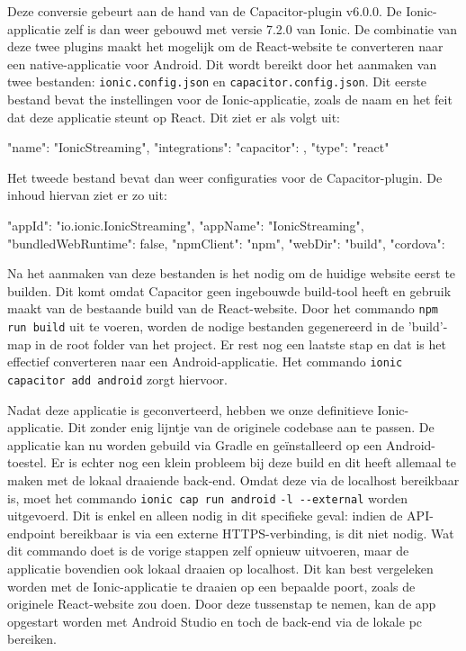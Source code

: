 Deze conversie gebeurt aan de hand van de Capacitor-plugin v6.0.0. De Ionic-applicatie zelf is dan weer gebouwd met versie 7.2.0 van Ionic. De combinatie van deze twee plugins maakt het mogelijk om de React-website te converteren naar een native-applicatie voor Android. Dit wordt bereikt door het aanmaken van twee bestanden: \verb|ionic.config.json| en \verb|capacitor.config.json|. Dit eerste bestand bevat the instellingen voor de Ionic-applicatie, zoals de naam en het feit dat deze applicatie steunt op React. Dit ziet er als volgt uit:

\begin{LVerbatim}[language=JavaScript]
{
  "name": "IonicStreaming",
  "integrations": {
    "capacitor": {}
  },
  "type": "react"
}
\end{LVerbatim}

Het tweede bestand bevat dan weer configuraties voor de Capacitor-plugin. De inhoud hiervan ziet er zo uit:

\begin{LVerbatim}[language=JavaScript]
{
  "appId": "io.ionic.IonicStreaming",
  "appName": "IonicStreaming",
  "bundledWebRuntime": false,
  "npmClient": "npm",
  "webDir": "build",
  "cordova": {}
}
\end{LVerbatim}

Na het aanmaken van deze bestanden is het nodig om de huidige website eerst te builden. Dit komt omdat Capacitor geen ingebouwde build-tool heeft en gebruik maakt van de bestaande build van de React-website. Door het commando \verb|npm run build| uit te voeren, worden de nodige bestanden gegenereerd in de 'build'-map in de root folder van het project. Er rest nog een laatste stap en dat is het effectief converteren naar een Android-applicatie. Het commando \verb|ionic capacitor add android| zorgt hiervoor.

Nadat deze applicatie is geconverteerd, hebben we onze definitieve Ionic-applicatie. Dit zonder enig lijntje van de originele codebase aan te passen. De applicatie kan nu worden gebuild via Gradle en geïnstalleerd op een Android-toestel. Er is echter nog een klein probleem bij deze build en dit heeft allemaal te maken met de lokaal draaiende back-end. Omdat deze via de localhost bereikbaar is, moet het commando \verb|ionic cap run android| \verb|-l --external| worden uitgevoerd. Dit is enkel en alleen nodig in dit specifieke geval: indien de API-endpoint bereikbaar is via een externe HTTPS-verbinding, is dit niet nodig. Wat dit commando doet is de vorige stappen zelf opnieuw uitvoeren, maar de applicatie bovendien ook lokaal draaien op localhost. Dit kan best vergeleken worden met de Ionic-applicatie te draaien op een bepaalde poort, zoals de originele React-website zou doen. Door deze tussenstap te nemen, kan de app opgestart worden met Android Studio en toch de back-end via de lokale pc bereiken.

